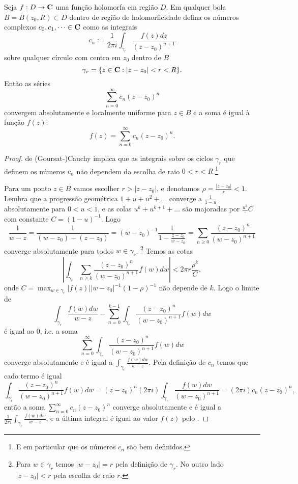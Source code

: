 \begin{teorema}
\label{t:hol-series}
Seja $f : D \to \mathbf{C}$ uma função holomorfa em região $D$.
Em qualquer bola $B = B(z_0,R) \subset D$ dentro de região de holomorficidade
defina os números complexos $c_0,c_1,\dots\in\mathbf{C}$ como as integrais
\begin{equation}
 c_n := \frac1{2\pi i} \int_{\gamma_r} \frac{f(z)dz}{(z-z_0)^{n+1}} 
\end{equation}
sobre qualquer círculo com centro em $z_0$ dentro de $B$  
\[ \gamma_r = \{ z\in \mathbf{C} : |z-z_0|< r < R \}. \]
Então as séries
\[ \sum_{n=0}^\infty c_n (z-z_0)^n \]
convergem absolutamente e localmente uniforme para $z\in B$
e a soma é igual à função $f(z)$:
\[ f(z) = \sum_{n=0}^\infty c_n (z-z_0)^n. \]
\end{teorema}
\begin{proof}
 de (Goursat-)Cauchy implica que as integrais sobre os ciclos $\gamma_r$
que definem os números $c_n$
não dependem da escolha de raio $0<r<R$.\footnote{E em particular que os números $c_n$ são bem definidos.}

Para um ponto $z\in B$ vamos escolher $r > |z-z_0|$, e denotamos $\rho = \frac{|z-z_0|}{r} < 1$.
Lembra que a progressão geométrica $1 + u + u^2 + \dots$ converge a $\frac{1}{1-u}$ absolutamente para $0<u<1$,
e as colas $u^k + u^{k+1} + \dots$ são majoradas por $\frac{u^k} \cdot C$ com constante $C = (1-u)^{-1}$.
Logo 
\begin{equation}
\label{eq:series-geometrica}
 \frac{1}{w-z} = \frac{1}{(w-z_0)-(z-z_0)} = (w-z_0)^{-1} \frac1{1-\frac{z-z_0}{w-z_0}}
= \sum_{n\geq 0} \frac{(z-z_0)^n}{(w-z_0)^{n+1}}
\end{equation}
converge absolutamente para todos $w\in\gamma_r$.
\footnote{Para $w\in \gamma_r$ temos $|w-z_0| = r$ pela definição de $\gamma_r$.
No outro lado $|z-z_0|<r$ pela escolha de raio $r$.}
Temos as cotas
\[ |\int_{\gamma_r} \sum_{n\geq k} \frac{(z-z_0)^n}{(w-z_0)^{n+1}} f(w) dw|
< 2\pi r \frac{\rho^k} C, \]
onde $C = \max_{w\in\gamma_r} |f(z)| |w-z_0|^{-1} (1-\rho)^{-1}$ não depende de $k$.
Logo o limite de
\[ \int_{\gamma_r} \frac{f(w)dw}{w-z} - \sum_{n=0}^{k-1} \int_{\gamma_r} \frac{(z-z_0)^n}{(w-z_0)^{n+1}} f(w) dw \]
é igual ao $0$, i.e. a soma
\[ \sum_{n=0}^\infty \int_{\gamma_r} \frac{(z-z_0)^n}{(w-z_0)^{n+1}} f(w) dw \]
converge absolutamente e é igual a $\int_{\gamma_r} \frac{f(w)dw}{w-z}$.
Pela definição de $c_n$ temos que cado termo é igual
\[ \int_{\gamma_r} \frac{(z-z_0)^n}{(w-z_0)^{n+1}} f(w) dw 
= (z-z_0)^n (2\pi i) \int_{\gamma_r} \frac{f(w)dw}{(w-z_0)^{n+1}}
= (2\pi i) c_n (z-z_0)^n, \]
então a soma $\sum_{n=0}^\infty c_n (z-z_0)^n$ converge absolutamente
e é igual a $\frac{1}{2\pi i} \int_{\gamma_r} \frac{f(w)dw}{w-z}$,
e a última integral é igual ao valor $f(z)$ pelo .
\end{proof}

